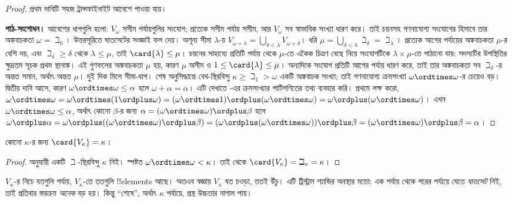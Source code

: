 \documentclass[../../../include/open-logic-section]{subfiles}
\begin{document}
\begin{proof}
প্রথম দাবিটি সহজ ট্রান্সফাইনাইট আবেশে পাওয়া যায়।
\par\noindent\textbf{পাঠ-সংশোধন।} আবেশের ধাপগুলি হলো: $V_\omega$ সসীম পর্যায়গুলির সংযোগ;
প্রত্যেক সসীম পর্যায় সসীম, আর $V_\omega$ সব স্বাভাবিক সংখ্যা
ধারণ করে। তাই চয়নসহ গণনাযোগ্য সংযোগের হিসাবে তার
অঙ্কবাচকতা $\omega=\beth_0$। উত্তরসূরিতে ঘাতসেটের সংজ্ঞাই
ফল দেয়। অশূন্য সীমা $\lambda$-য়
$V_{\omega+\lambda}=\bigcup_{\delta<\lambda}V_{\omega+\delta}$।
ধরি $\mu=\bigcup_{\delta<\lambda}\beth_\delta=\beth_\lambda$।
প্রত্যেক আগের পর্যায়ের অঙ্কবাচকতা $\mu$-র বেশি নয়, এবং
$\beth_\delta\geq\delta$ থেকে $\lambda\leq\mu$, তাই
$\card{\lambda}\leq\mu$। চয়নের সাহায্যে প্রতিটি পর্যায় থেকে
$\mu$-তে একৈক চিত্রণ বেছে নিয়ে সংযোগটিকে
$\lambda\times\mu$-তে পাঠানো যায়: সদস্যটির উপস্থিতির
ক্ষুদ্রতম সূচক প্রথম স্থানাঙ্ক। এই গুণফলের অঙ্কবাচকতা $\mu$
হয়, কারণ $\mu$ অসীম ও $1\leq\card{\lambda}\leq\mu$।
অন্যদিকে সংযোগ প্রতিটি আগের পর্যায় ধারণ করে, তাই তার
অঙ্কবাচকতা সব $\beth_\delta$-র অন্তত সমান, অর্থাৎ অন্তত
$\mu$। দুই দিক মিলে সীমা-ধাপ। শেষ অনুসিদ্ধান্তে বেথ-স্থিরবিন্দু
$\kappa\geq\beth_1>\omega$ একটি অঙ্কবাচক সংখ্যা; তাই
গণনাযোগ্য ক্রমসংখ্যা $\omega\ordtimes\omega$-র চেয়েও বড়।
দ্বিতীয় দাবি আসে, কারণ
$\omega\ordtimes\omega\leq\alpha$ হলে
$\omega+\alpha=\alpha$। এটি দেখাতে
-এর ক্রমসংখ্যার
পাটিগণিতের তথ্য ব্যবহার করি। প্রথমে লক্ষ করো,
$\omega\ordtimes\omega=
\omega\ordtimes(1\ordplus\omega)=
(\omega\ordtimes 1)\ordplus(\omega\ordtimes\omega)=
\omega\ordplus(\omega\ordtimes\omega)$।
এখন $\omega\ordtimes\omega\leq\alpha$,
অর্থাৎ কোনো $\beta$-র জন্য
$\alpha=(\omega\ordtimes\omega)\ordplus\beta$ হলে
$\omega\ordplus\alpha=
\omega\ordplus((\omega\ordtimes\omega)\ordplus\beta)=
(\omega\ordplus(\omega\ordtimes\omega))\ordplus\beta=
(\omega\ordtimes\omega)\ordplus\beta=\alpha$।
\end{proof}

\begin{cor}
কোনো $\kappa$-র জন্য $\card{V_\kappa}=\kappa$।
\end{cor}

\begin{proof}
 অনুযায়ী একটি $\beth$-স্থিরবিন্দু
$\kappa$ নিই। স্পষ্টত $\omega\ordtimes\omega<\kappa$।
তাই  থেকে
$\card{V_\kappa}=\beth_\kappa=\kappa$।
\end{proof}

$V_\kappa$-র নিচে যতগুলি পর্যায়,
$V_\kappa$-তে ততগুলি !!{element}s আছে।
অতএব স্বজ্ঞায় $V_\kappa$ যত চওড়া, ততই উঁচু।
এটি ট্রিস্ট্রাম শ্যান্ডির অবস্থার মতো: এক পর্যায়
থেকে পরের পর্যায়ে যেতে \emph{ঘাতসেট} নিই,
তাই প্রতিবার স্তরক্রম \emph{অনেক} বড় হয়।
কিন্তু ``শেষে'', অর্থাৎ $\kappa$ পর্যায়ে,
প্রস্থ উচ্চতার নাগাল পায়।
\end{document}
